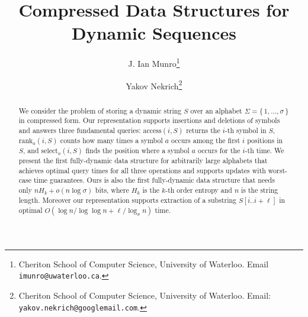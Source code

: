 \documentclass[11pt]{article}\usepackage{fullpage}
\def\idrm#1{\ensuremath{\mathrm{#1}}}
\newcommand{\ra}{\idrm{rank}}
\newcommand{\sel}{\idrm{select}}
\newcommand{\acc}{\idrm{access}}
\begin{document}
\title{Compressed Data Structures  for  Dynamic Sequences}

\author{
 J. Ian Munro\thanks{Cheriton School of Computer Science, University of Waterloo. Email {\tt imunro@uwaterloo.ca}.}
 \and
 Yakov Nekrich\thanks{Cheriton School of Computer Science, University of Waterloo.
 Email: {\tt yakov.nekrich@googlemail.com}.}
}
\date{}
\maketitle

\begin{abstract}
We consider the problem of storing a dynamic string $S$ over an alphabet $\Sigma=\{\,1,\ldots,\sigma\,\}$ in compressed form. Our representation supports insertions and deletions of symbols and answers three 
fundamental queries: $\acc(i,S)$ returns the $i$-th symbol in $S$, $\ra_a(i,S)$
counts how many times a symbol $a$ occurs among the first $i$ positions in $S$, 
and $\sel_a(i,S)$ finds the position where a symbol $a$ occurs for the $i$-th time. We present the first fully-dynamic data structure for arbitrarily large alphabets that achieves optimal query times for all three operations and supports updates with worst-case time guarantees. Ours is also the first fully-dynamic data structure that needs only $nH_k+o(n\log\sigma)$ bits, where $H_k$ is the $k$-th order entropy and $n$ is the string length. 
Moreover our representation supports extraction of a substring $S[i..i+\ell]$ in optimal $O(\log n/\log\log n + \ell/\log_{\sigma}n)$ time.
\end{abstract}
 
\end{document}
